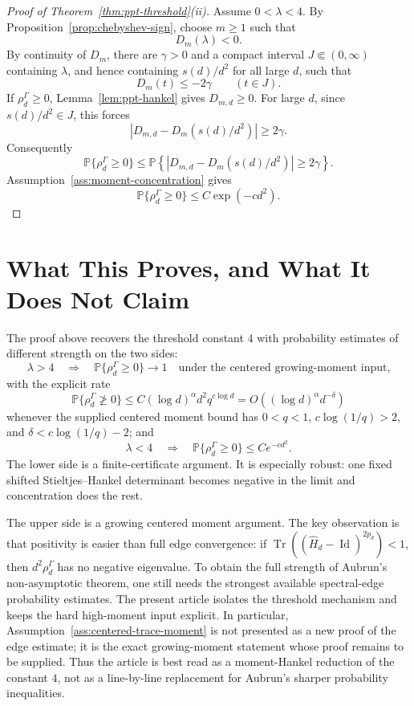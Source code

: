 \documentclass[11pt,reqno]{amsart}
\newcommand{\PP}{\mathbb P}
\newcommand{\Tr}{\operatorname{Tr}}
\newcommand{\Id}{\operatorname{Id}}
\newcommand{\abs}[1]{\left\lvert #1\right\rvert}
\begin{document}
\begin{proof}[Proof of Theorem~\ref{thm:ppt-threshold}(ii)]
Assume \(0<\lambda<4\).  By Proposition~\ref{prop:chebyshev-sign}, choose
\(m\ge1\) such that
\[
  D_m(\lambda)<0.
\]
By continuity of \(D_m\), there are \(\gamma>0\) and a compact interval
\(J\Subset(0,\infty)\) containing \(\lambda\), and hence containing
\(s(d)/d^2\) for all large \(d\), such that
\[
  D_m(t)\le -2\gamma
  \qquad (t\in J).
\]
If \(\rho_d^\Gamma\ge0\), Lemma~\ref{lem:ppt-hankel} gives \(D_{m,d}\ge0\).
For large \(d\), since \(s(d)/d^2\in J\), this forces
\[
  \abs{D_{m,d}-D_m(s(d)/d^2)}\ge 2\gamma.
\]
Consequently
\[
  \PP\{\rho_d^\Gamma\ge0\}
  \le
  \PP\left\{
    \abs{D_{m,d}-D_m(s(d)/d^2)}\ge2\gamma
  \right\}.
\]
Assumption~\ref{ass:moment-concentration} gives
\[
  \PP\{\rho_d^\Gamma\ge0\}\le C\exp(-c d^2).
\]
\end{proof}

\section{What This Proves, and What It Does Not Claim}

The proof above recovers the threshold constant \(4\) with probability
estimates of different strength on the two sides:
\[
  \lambda>4
  \quad\Longrightarrow\quad
  \PP\{\rho_d^\Gamma\ge0\}\to1
  \quad\text{under the centered growing-moment input,}
\]
with the explicit rate
\[
  \PP\{\rho_d^\Gamma\ngeq0\}
  \le C(\log d)^\alpha d^2q^{c\log d}
  =
  O((\log d)^\alpha d^{-\delta})
\]
whenever the supplied centered moment bound has
\(0<q<1\), \(c\log(1/q)>2\), and
\(\delta<c\log(1/q)-2\);
and
\[
  \lambda<4
  \quad\Longrightarrow\quad
  \PP\{\rho_d^\Gamma\ge0\}\le Ce^{-c d^2}.
\]
The lower side is a finite-certificate argument.  It is especially robust:
one fixed shifted Stieltjes--Hankel determinant becomes negative in the limit
and concentration does the rest.

The upper side is a growing centered moment argument.  The key observation is
that positivity is easier than full edge convergence: if
\(\Tr((\widehat H_d-\Id)^{2p_d})<1\), then \(d^2\rho_d^\Gamma\) has no
negative eigenvalue.  To obtain the full strength of Aubrun's
non-asymptotic theorem, one still needs the strongest available spectral-edge
probability estimates.  The present article isolates the threshold mechanism
and keeps the hard high-moment input explicit.  In particular,
Assumption~\ref{ass:centered-trace-moment} is not presented as a new proof of
the edge estimate; it is the exact growing-moment statement whose proof
remains to be supplied.  Thus the article is best read as a moment-Hankel
reduction of the constant \(4\), not as a line-by-line replacement for
Aubrun's sharper probability inequalities.
\end{document}

